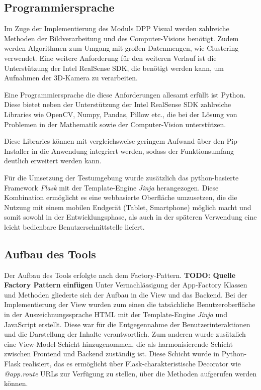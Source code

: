 \documentclass[
    type=Projektarbeit,
    status=draft, %
    language=german, %
    bibengine=bibtex,
]{unibwm-inf-thesis}
\newcommand{\todo}[1]{\textbf{TODO: #1}}
\begin{document}
    \subsection{Programmiersprache}
    Im Zuge der Implementierung des Moduls DPP Visual werden zahlreiche Methoden der Bildverarbeitung und des
    Computer-Visions benötigt.
    Zudem werden Algorithmen zum Umgang mit großen Datenmengen, wie Clustering verwendet.
    Eine weitere Anforderung für den weiteren Verlauf ist die Unterstützung der Intel RealSense SDK, die benötigt werden kann,
    um Aufnahmen der 3D-Kamera zu verarbeiten.

    Eine Programmiersprache die diese Anforderungen allesamt erfüllt ist Python.
    Diese bietet neben der Unterstützung der Intel RealSense SDK zahlreiche Libraries wie OpenCV, Numpy, Pandas,
    Pillow etc., die bei der Lösung von Problemen in der Mathematik sowie der Computer-Vision unterstützen.

    Diese Libraries können mit vergleichsweise geringem Aufwand über den Pip-Installer in die Anwendung integriert
    werden, sodass der Funktionsumfang deutlich erweitert werden kann.

    Für die Umsetzung der Testumgebung wurde zusätzlich das python-basierte Framework \textit{Flask} mit der
    Template-Engine \textit{Jinja} herangezogen.
    Diese Kombination ermöglicht es eine webbasierte Oberfläche umzusetzen, die die Nutzung mit einem mobilen Endgerät
    (Tablet, Smartphone) möglich macht und somit sowohl in der Entwicklungsphase, als auch in der späteren Verwendung eine leicht bedienbare Benutzerschnittstelle liefert.

    \subsection{Aufbau des Tools} \label{subsec:aufbau-des-tools}
    Der Aufbau des Tools erfolgte nach dem Factory-Pattern. \todo{Quelle Factory Pattern einfügen}
    Unter Vernachlässigung der App-Factory Klassen und Methoden gliederte sich der Aufbau in die View und das Backend.
    Bei der Implementierung der View wurden zum einen die tatsächliche Benutzeroberfläche in der Auszeichnungssprache
    HTML mit der Template-Engine \textit{Jinja} und JavaScript erstellt.
    Diese war für die Entgegennahme der Benutzerinteraktionen und die Darstellung der Inhalte verantwortlich.
    Zum anderen wurde zusätzlich eine View-Model-Schicht hinzugenommen, die als harmonisierende Schicht zwischen
    Frontend und Backend zuständig ist.
    Diese Schicht wurde in Python-Flask realisiert, das es ermöglicht über Flask-charakteristische Decorator wie
    \textit{@app.route} URLs zur Verfügung zu stellen, über die Methoden aufgerufen werden können.
\end{document}
